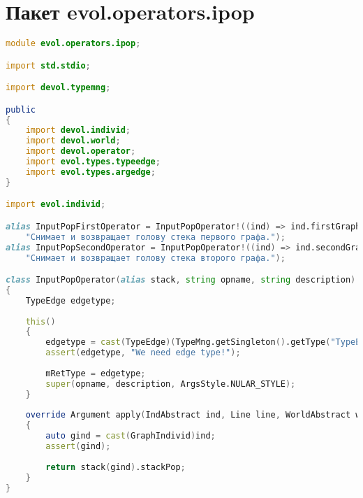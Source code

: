 \documentclass[russian,utf8,emptystyle]{eskdtext}
\begin{document}
\section{Пакет evol.operators.ipop}
\begin{lstlisting}[language=D]
module evol.operators.ipop;

import std.stdio;

import devol.typemng;

public
{
    import devol.individ;
    import devol.world;
    import devol.operator;
    import evol.types.typeedge;
    import evol.types.argedge;
}

import evol.individ;

alias InputPopFirstOperator = InputPopOperator!((ind) => ind.firstGraphStack, "ipop1",
    "Снимает и возвращает голову стека первого графа.");
alias InputPopSecondOperator = InputPopOperator!((ind) => ind.secondGraphStack, "ipop2",
    "Снимает и возвращает голову стека второго графа.");

class InputPopOperator(alias stack, string opname, string description) : Operator
{
    TypeEdge edgetype;
    
    this()
    {
        edgetype = cast(TypeEdge)(TypeMng.getSingleton().getType("TypeEdge"));
        assert(edgetype, "We need edge type!");
        
        mRetType = edgetype;
        super(opname, description, ArgsStyle.NULAR_STYLE);
    }
    
    override Argument apply(IndAbstract ind, Line line, WorldAbstract world)
    {
        auto gind = cast(GraphIndivid)ind;
        assert(gind);
        
        return stack(gind).stackPop;
    }   
}
\end{lstlisting}
\end{document}
